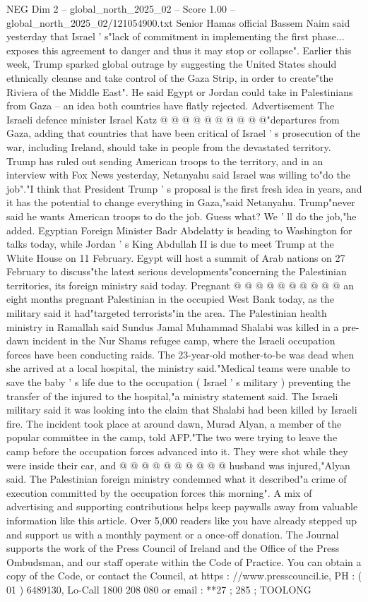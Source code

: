 \begin{textsample}{NEG Dim 2 – global\_north\_2025\_02 – Score 1.00 – global\_north\_2025\_02/121054900.txt}
Senior Hamas official Bassem Naim said yesterday that Israel ' s"lack of commitment in implementing the first phase... exposes this agreement to danger and thus it may stop or collapse".
Earlier this week, Trump sparked global outrage by suggesting the United States should ethnically cleanse and take control of the Gaza Strip, in order to create"the Riviera of the Middle East".
He said Egypt or Jordan could take in Palestinians from Gaza -- an idea both countries have flatly rejected.
Advertisement The Israeli defence minister Israel Katz @ @ @ @ @ @ @ @ @ @"departures from Gaza, adding that countries that have been critical of Israel ' s prosecution of the war, including Ireland, should take in people from the devastated territory.
Trump has ruled out sending American troops to the territory, and in an interview with Fox News yesterday, Netanyahu said Israel was willing to"do the job"."I think that President Trump ' s proposal is the first fresh idea in years, and it has the potential to change everything in Gaza,"said Netanyahu.
Trump"never said he wants American troops to do the job.
Guess what?
We ' ll do the job,"he added.
Egyptian Foreign Minister Badr Abdelatty is heading to Washington for talks today, while Jordan ' s King Abdullah II is due to meet Trump at the White House on 11 February.
Egypt will host a summit of Arab nations on 27 February to discuss"the latest serious developments"concerning the Palestinian territories, its foreign ministry said today.
Pregnant @ @ @ @ @ @ @ @ @ @ an eight months pregnant Palestinian in the occupied West Bank today, as the military said it had"targeted terrorists"in the area.
The Palestinian health ministry in Ramallah said Sundus Jamal Muhammad Shalabi was killed in a pre-dawn incident in the Nur Shams refugee camp, where the Israeli occupation forces have been conducting raids.
The 23-year-old mother-to-be was dead when she arrived at a local hospital, the ministry said."Medical teams were unable to save the baby ' s life due to the occupation ( Israel ' s military ) preventing the transfer of the injured to the hospital,"a ministry statement said.
The Israeli military said it was looking into the claim that Shalabi had been killed by Israeli fire.
The incident took place at around dawn, Murad Alyan, a member of the popular committee in the camp, told AFP."The two were trying to leave the camp before the occupation forces advanced into it.
They were shot while they were inside their car, and @ @ @ @ @ @ @ @ @ @ husband was injured,"Alyan said.
The Palestinian foreign ministry condemned what it described"a crime of execution committed by the occupation forces this morning".
A mix of advertising and supporting contributions helps keep paywalls away from valuable information like this article.
Over 5,000 readers like you have already stepped up and support us with a monthly payment or a once-off donation.
The Journal supports the work of the Press Council of Ireland and the Office of the Press Ombudsman, and our staff operate within the Code of Practice.
You can obtain a copy of the Code, or contact the Council, at https : //www.presscouncil.ie, PH : ( 01 ) 6489130, Lo-Call 1800 208 080 or email : **27 ; 285 ; TOOLONG

\end{textsample}
